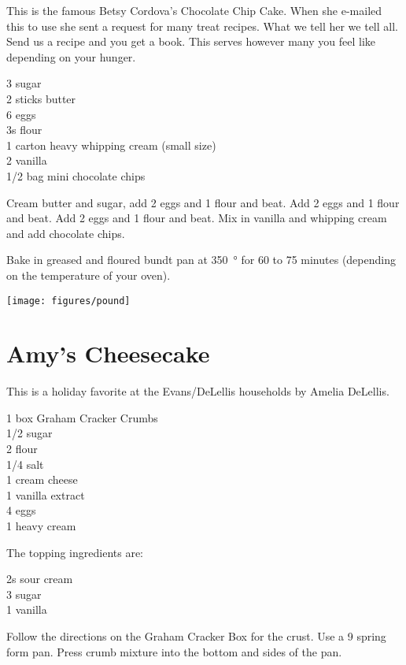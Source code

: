 \begin{open}
  This is the famous Betsy Cordova's Chocolate Chip Cake. When she e-mailed this
  to use she sent a request for many treat recipes.  What we tell her we tell
  all.  Send us a recipe and you get a book.  This serves however many you feel
  like depending on your hunger.
\end{open}
\begin{ingredients}
  \SI{3}{\cup} sugar \\
  2 sticks butter \\
  6 eggs \\
  \SI{3}{\cup}s flour  \\
  1 carton heavy whipping cream (small size) \\
  \SI{2}{\tblspoon}  vanilla \\
  \num{1/2} bag mini chocolate chips
\end{ingredients}
Cream butter and sugar, add 2 eggs and \SI{1}{\cup} flour and beat.  Add 2
eggs and \SI{1}{\cup} flour and beat. Add 2 eggs and \SI{1}{\cup} flour and
beat.  Mix in vanilla and whipping cream and add chocolate chips.

Bake in greased and floured bundt pan at \SI{350}{\degree} for 60 to 75
minutes (depending on the temperature of your oven).
\begin{center}
\texttt{[image: figures/pound]}
\end{center}

\section{Amy's Cheesecake}

\begin{open}
  This is a holiday favorite at the Evans/DeLellis households by Amelia
  DeLellis.
\end{open}
\begin{ingredients}
  1 box Graham Cracker Crumbs \\
  \SI{1/2}{\cup} sugar \\
  \SI{2}{\tblspoon}  flour \\
  \SI{1/4}{\teaspoon}  salt \\
  \SI{1}{\pound} cream cheese \\
  \SI{1}{\teaspoon}  vanilla extract \\
  4 eggs \\
  \SI{1}{\cup} heavy cream
\end{ingredients}
The topping ingredients are:
\begin{ingredients}
  \SI{2}{\cup}s sour cream \\
  \SI{3}{\tblspoon}  sugar \\
  \SI{1}{\teaspoon} vanilla
\end{ingredients}
Follow the directions on the Graham Cracker Box for the crust.  Use a
\SI{9}{\inch} spring form pan.  Press crumb mixture into the bottom and sides
of the pan.

